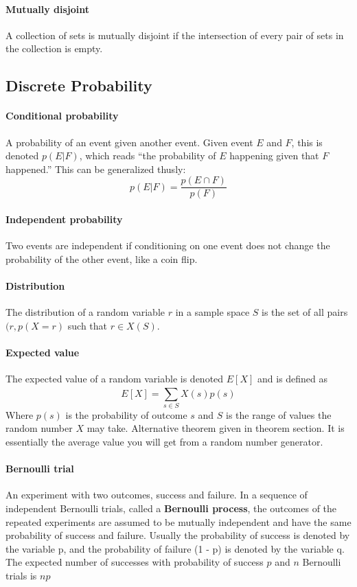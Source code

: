 \documentclass[a4paper]{article}
\begin{document}
\paragraph{Mutually disjoint} A collection of sets is mutually disjoint if the intersection of every pair of sets in the collection is empty.
\pagebreak
\subsection{Discrete Probability}
\paragraph{Conditional probability} A probability of an event given another event. Given event $E$ and $F$, this is denoted $p(E|F)$, which reads ``the probability of $E$ happening given that $F$ happened.'' This can be generalized thusly:
\begin{equation*}
  p(E|F) = \frac{p(E \cap F)}{p(F)}
\end{equation*}
\paragraph{Independent probability} Two events are independent if conditioning on one event does not change the probability of the other event, like a coin flip. 
\paragraph{Distribution} The distribution of a random variable $r$ in a sample space $S$ is the set of all pairs $(r, p(X = r)$ such that $r \in X(S)$.
  \paragraph{Expected value} The expected value of a random variable is denoted $E[X]$ and is defined as
  \begin{equation*}
    E[X] = \sum_{s \in S}^{} X(s) p(s)
  \end{equation*}
  Where $p(s)$ is the probability of outcome $s$ and $S$ is the range of values the random number $X$ may take. Alternative theorem given in theorem section. It is essentially the average value you will get from a random number generator.
  \paragraph{Bernoulli trial} An experiment with two outcomes, success and failure. In a sequence of independent Bernoulli trials, called a \textbf{Bernoulli process}, the outcomes of the repeated experiments are assumed to be mutually independent and have the same probability of success and failure. Usually the probability of success is denoted by the variable p, and the probability of failure (1 - p) is denoted by the variable q. The expected number of successes with probability of success $p$ and $n$ Bernoulli trials is $np$
\end{document}
